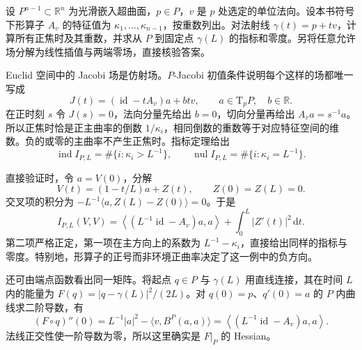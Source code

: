 \begin{exercise}\label{g3:ex:euclidean-focal-principal-curvatures}
	设 \(P^{n-1}\subset\mathbb R^n\) 为光滑嵌入超曲面，\(p\in P\)，\(v\) 是 \(p\) 处选定的单位法向。设本书符号下形算子 \(A_v\) 的特征值为 \(\kappa_1,\ldots,\kappa_{n-1}\)，按重数列出。对法射线 \(\gamma(t)=p+tv\)，计算所有正焦时及其重数，并求从 \(P\) 到固定点 \(\gamma(L)\) 的指标和零度。另将任意允许场分解为线性插值与两端零场，直接核验答案。
\end{exercise}
\begin{solution}
	Euclid 空间中的 Jacobi 场是仿射场。\(P\)-Jacobi 初值条件说明每个这样的场都唯一写成
	\[
		J(t)=(\operatorname{id}-tA_v)a+btv,
		\qquad a\in\mathrm T_pP,\quad b\in\mathbb R.
	\]
	在正时刻 \(s\) 令 \(J(s)=0\)，法向分量先给出 \(b=0\)，切向分量再给出 \(A_va=s^{-1}a\)。所以正焦时恰是正主曲率的倒数 \(1/\kappa_i\)，相同倒数的重数等于对应特征空间的维数。负的或零的主曲率不产生正焦时。指标定理给出
	\[
		\operatorname{ind}I_{P,L}=\#\{i:\kappa_i>L^{-1}\},\qquad
		\operatorname{nul}I_{P,L}=\#\{i:\kappa_i=L^{-1}\}.
	\]

	直接验证时，令 \(a=V(0)\)，分解
	\[
		V(t)=(1-t/L)a+Z(t),\qquad Z(0)=Z(L)=0.
	\]
	交叉项的积分为
	\(-L^{-1}\langle a,Z(L)-Z(0)\rangle=0\)。于是
	\[
		I_{P,L}(V,V)=
		\left\langle(L^{-1}\operatorname{id}-A_v)a,a\right\rangle
		+\int_0^L|Z'(t)|^2\,\mathrm dt.
	\]
	第二项严格正定，第一项在主方向上的系数为 \(L^{-1}-\kappa_i\)，直接给出同样的指标与零度。特别地，形算子的正号而非环境正曲率决定了这一例中的负方向。

	还可由端点函数看出同一矩阵。将起点 \(q\in P\) 与 \(\gamma(L)\) 用直线连接，其在时间 \(L\) 内的能量为
	\(F(q)=|q-\gamma(L)|^2/(2L)\)。对 \(q(0)=p\)、\(q'(0)=a\) 的 \(P\) 内曲线求二阶导数，有
	\[
		(F\circ q)''(0)=L^{-1}|a|^2-
		\langle v,B^P(a,a)\rangle
		=\left\langle(L^{-1}\operatorname{id}-A_v)a,a\right\rangle.
	\]
	法线正交性使一阶导数为零，所以这里确实是 \(F|_P\) 的 Hessian。
\end{solution}

